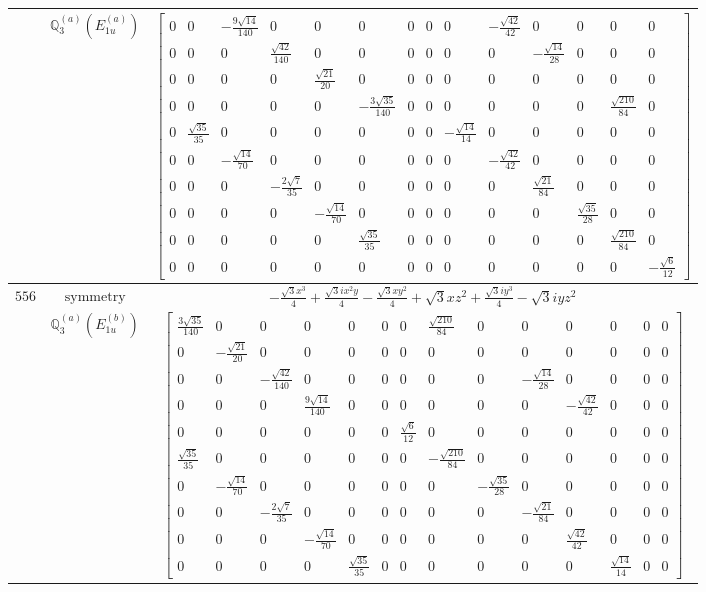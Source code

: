 \documentclass[fleqn,8pt,landscape]{jsarticle}
\begin{document}
\begin{longtable}{ccc}
$  $ & $ \mathbb{Q}_{3}^{(a)}(E_{1u}^{(a)}) $ & $ \begin{bmatrix} 0 & 0 & - \frac{9 \sqrt{14}}{140} & 0 & 0 & 0 & 0 & 0 & 0 & - \frac{\sqrt{42}}{42} & 0 & 0 & 0 & 0 \\ 0 & 0 & 0 & \frac{\sqrt{42}}{140} & 0 & 0 & 0 & 0 & 0 & 0 & - \frac{\sqrt{14}}{28} & 0 & 0 & 0 \\ 0 & 0 & 0 & 0 & \frac{\sqrt{21}}{20} & 0 & 0 & 0 & 0 & 0 & 0 & 0 & 0 & 0 \\ 0 & 0 & 0 & 0 & 0 & - \frac{3 \sqrt{35}}{140} & 0 & 0 & 0 & 0 & 0 & 0 & \frac{\sqrt{210}}{84} & 0 \\ 0 & \frac{\sqrt{35}}{35} & 0 & 0 & 0 & 0 & 0 & 0 & - \frac{\sqrt{14}}{14} & 0 & 0 & 0 & 0 & 0 \\ 0 & 0 & - \frac{\sqrt{14}}{70} & 0 & 0 & 0 & 0 & 0 & 0 & - \frac{\sqrt{42}}{42} & 0 & 0 & 0 & 0 \\ 0 & 0 & 0 & - \frac{2 \sqrt{7}}{35} & 0 & 0 & 0 & 0 & 0 & 0 & \frac{\sqrt{21}}{84} & 0 & 0 & 0 \\ 0 & 0 & 0 & 0 & - \frac{\sqrt{14}}{70} & 0 & 0 & 0 & 0 & 0 & 0 & \frac{\sqrt{35}}{28} & 0 & 0 \\ 0 & 0 & 0 & 0 & 0 & \frac{\sqrt{35}}{35} & 0 & 0 & 0 & 0 & 0 & 0 & \frac{\sqrt{210}}{84} & 0 \\ 0 & 0 & 0 & 0 & 0 & 0 & 0 & 0 & 0 & 0 & 0 & 0 & 0 & - \frac{\sqrt{6}}{12} \end{bmatrix} $ \\ \hline
$ 556 $ & $ \text{symmetry} $ & $ - \frac{\sqrt{3} x^{3}}{4} + \frac{\sqrt{3} i x^{2} y}{4} - \frac{\sqrt{3} x y^{2}}{4} + \sqrt{3} x z^{2} + \frac{\sqrt{3} i y^{3}}{4} - \sqrt{3} i y z^{2} $ \\
$  $ & $ \mathbb{Q}_{3}^{(a)}(E_{1u}^{(b)}) $ & $ \begin{bmatrix} \frac{3 \sqrt{35}}{140} & 0 & 0 & 0 & 0 & 0 & 0 & \frac{\sqrt{210}}{84} & 0 & 0 & 0 & 0 & 0 & 0 \\ 0 & - \frac{\sqrt{21}}{20} & 0 & 0 & 0 & 0 & 0 & 0 & 0 & 0 & 0 & 0 & 0 & 0 \\ 0 & 0 & - \frac{\sqrt{42}}{140} & 0 & 0 & 0 & 0 & 0 & 0 & - \frac{\sqrt{14}}{28} & 0 & 0 & 0 & 0 \\ 0 & 0 & 0 & \frac{9 \sqrt{14}}{140} & 0 & 0 & 0 & 0 & 0 & 0 & - \frac{\sqrt{42}}{42} & 0 & 0 & 0 \\ 0 & 0 & 0 & 0 & 0 & 0 & \frac{\sqrt{6}}{12} & 0 & 0 & 0 & 0 & 0 & 0 & 0 \\ \frac{\sqrt{35}}{35} & 0 & 0 & 0 & 0 & 0 & 0 & - \frac{\sqrt{210}}{84} & 0 & 0 & 0 & 0 & 0 & 0 \\ 0 & - \frac{\sqrt{14}}{70} & 0 & 0 & 0 & 0 & 0 & 0 & - \frac{\sqrt{35}}{28} & 0 & 0 & 0 & 0 & 0 \\ 0 & 0 & - \frac{2 \sqrt{7}}{35} & 0 & 0 & 0 & 0 & 0 & 0 & - \frac{\sqrt{21}}{84} & 0 & 0 & 0 & 0 \\ 0 & 0 & 0 & - \frac{\sqrt{14}}{70} & 0 & 0 & 0 & 0 & 0 & 0 & \frac{\sqrt{42}}{42} & 0 & 0 & 0 \\ 0 & 0 & 0 & 0 & \frac{\sqrt{35}}{35} & 0 & 0 & 0 & 0 & 0 & 0 & \frac{\sqrt{14}}{14} & 0 & 0 \end{bmatrix} $ \\ \hline

\end{longtable}
\end{document}
